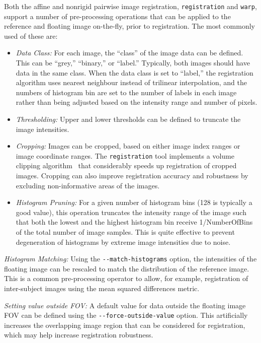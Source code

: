 \documentclass{InsightArticle}
\begin{document}
Both the affine and nonrigid pairwise image registration, \verb|registration|
and \verb|warp|, support a number of pre-processing operations that can be
applied to the reference and floating image on-the-fly, prior to
registration. The most commonly used of these are:
\begin{itemize}
\item {\em Data Class:\/} For each image, the ``class'' of the image data can
  be defined. This can be ``grey,'' ``binary,'' or ``label.'' Typically, both
  images should have data in the same class. When the data class is set to
  ``label,'' the registration algorithm uses nearest neighbour instead of
  trilinear interpolation, and the numbers of histogram bin are set to the
  number of labels in each image rather than being adjusted based on the
  intensity range and number of pixels.
\item {\em Thresholding:\/} Upper and lower thresholds can be defined to
  truncate the image intensities.
\item {\em Cropping:\/} Images can be cropped, based on either image index
  ranges or image coordinate ranges. The \verb|registration| tool implements a
  volume clipping algorithm~\cite{Rohlfing:2003} that considerably speeds up
  registration of cropped images. Cropping can also improve registration
  accuracy and robustness by excluding non-informative areas of the images.
\item {\em Histogram Pruning:\/} For a given number of histogram bins (128 is
  typically a good value), this operation truncates the intensity range of the
  image such that both the lowest and the highest histogram bin receive
  1/NumberOfBins of the total number of image samples. This is quite effective
  to prevent degeneration of histograms by extreme image intensities due to
  noise.
\end{itemize}

{\em Histogram Matching:\/} Using the \verb|--match-histograms| option, the
intensities of the floating image can be rescaled to match the distribution of
the reference image. This is a common pre-processing operator to allow, for
example, registration of inter-subject images using the mean squared
differences metric.

{\em Setting value outside FOV:\/} A default value for data outside the
floating image FOV can be defined using the \verb|--force-outside-value|
option. This artificially increases the overlapping image region that can be
considered for registration, which may help increase registration robustness. 
\end{document}
